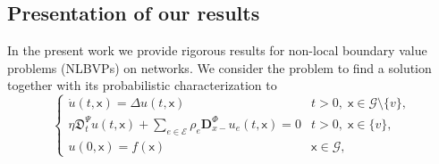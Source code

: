 \documentclass[11pt,a4paper]{article}
\theoremstyle{plain}
\theoremstyle{definition}
\theoremstyle{remark}
\begin{document}
	\subsection{Presentation of our results}
	In the present work we provide rigorous results for non-local boundary value problems (NLBVPs) on networks. We consider the problem to find a solution together with its probabilistic characterization to
	\begin{equation}
		\left\lbrace
		\begin{array}{ll}
			\displaystyle \dot{u}(t,\mathsf{x})= \Delta u(t,\mathsf{x}) & t>0, \; \mathsf{x} \in \mathcal{G}\setminus \{v\}, \\
			\displaystyle \eta \mathfrak{D}^\Psi_t u (t, \mathsf{x}) + \sum_{e \in \mathcal{E}} \rho_e\mathbf{D}^\Phi_{x-} u_e(t, \mathsf{x}) = 0 & t>0, \; \mathsf{x} \in \{v\},\\ 
			\displaystyle u(0,\mathsf{x})=f(\mathsf{x}) & \mathsf{x} \in \mathcal{G},
		\end{array}
		\right .
		\label{NLBVPgraphIntro}
	\end{equation}
\end{document}
